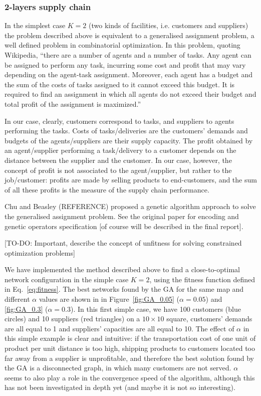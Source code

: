 \documentclass[12pt,titlepage]{article}
\begin{document}
\subsubsection*{2-layers supply chain}

In the simplest case $K = 2$ (two kinds of facilities, i.e. customers and suppliers) the problem described above is equivalent to a generalised assignment problem, a well defined problem in combinatorial optimization. In this problem, quoting Wikipedia, ``there are a number of agents and a number of tasks. Any agent can be assigned to perform any task, incurring some cost and profit that may vary depending on the agent-task assignment. Moreover, each agent has a budget and the sum of the costs of tasks assigned to it cannot exceed this budget. It is required to find an assignment in which all agents do not exceed their budget and total profit of the assignment is maximized.'' 

In our case, clearly, customers correspond to tasks, and suppliers to agents performing the tasks. Costs of tasks/deliveries are the customers' demands and budgets of the agents/suppliers are their supply capacity. The profit obtained by an agent/supplier performing a task/delivery to a customer depends on the distance between the supplier and the customer. In our case, however, the concept of profit is not associated to the agent/supplier, but rather to the job/customer: profits are made by selling products to end-customers, and the sum of all these profits is the measure of the supply chain performance.

Chu and Beasley (REFERENCE) proposed a genetic algorithm approach to solve the generalised assignment problem. See the original paper for encoding and genetic operators specification [of course will be described in the final report].

[TO-DO: Important, describe the concept of unfitness for solving constrained optimization problems]

We have implemented the method described above to find a close-to-optimal network configuration in the simple case $K = 2$, using the fitness function defined in Eq.~\ref{eq:fitness}. The best networks found by the GA for the same map and different $\alpha$ values are shown in in Figure~\ref{fig:GA_0.05} ($\alpha = 0.05$) and \ref{fig:GA_0.3} ($\alpha = 0.3$). In this first simple case, we have 100 customers (blue circles) and 10 suppliers (red triangles) on a $10 \times 10$ square, customers' demands are all equal to 1 and suppliers' capacities are all equal to 10. The effect of $\alpha$ in this simple example is clear and intuitive: if the transportation cost of one unit of product per unit distance is too high, shipping products to customers located too far away from a supplier is unprofitable, and therefore the best solution found by the GA is a disconnected graph, in which many customers are not served. $\alpha$ seems to also play a role in the convergence speed of the algorithm, although this has not been investigated in depth yet (and maybe it is not so interesting).
\end{document}
